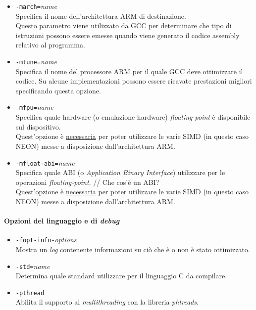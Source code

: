 \begin{itemize}
  
  \item \verb|-march=|\emph{name}\\
  Specifica il nome dell'architettura ARM di destinazione.\\
  Questo parametro viene utilizzato da GCC per determinare che tipo di 
  istruzioni possono essere emesse quando viene generato il codice assembly 
  relativo al programma.
  
  \item \verb|-mtune=|\emph{name}\\
  Specifica il nome del processore ARM per il quale GCC deve ottimizzare il 
  codice. Su alcune implementazioni possono essere ricavate prestazioni 
  migliori specificando questa opzione.
  
  \item \verb|-mfpu=|\emph{name}\\
  Specifica quale hardware (o emulazione hardware) \emph{floating-point} è 
  disponibile sul dispositivo.\\
  Quest'opzione è \underline{necessaria} per poter utilizzare le varie SIMD (in 
  questo caso NEON) messe a disposizione dall'architettura ARM.
  
  \item \verb|-mfloat-abi=|\emph{name}\\
  Specifica quale ABI (o \emph{Application Binary Interface}) utilizzare per le 
  operazioni \emph{floating-point}. // Che cos'è un ABI? \\
  Quest'opzione è \underline{necessaria} per poter utilizzare le varie SIMD (in 
  questo caso NEON) messe a disposizione dall'architettura ARM.
  
\end{itemize}

\paragraph{Opzioni del linguaggio e di \emph{debug}}

\begin{itemize}
  
  \item \verb|-fopt-info-|\emph{options}\\
  Mostra un \emph{log} contenente informazioni su ciò che è o non è stato 
  ottimizzato.
  
  \item \verb|-std=|\emph{name}\\
  Determina quale standard utilizzare per il linguaggio C da compilare.
  
  \item \verb|-pthread|\\
  Abilita il supporto al \emph{multithreading} con la libreria \emph{phtreads}.
  
\end{itemize}

